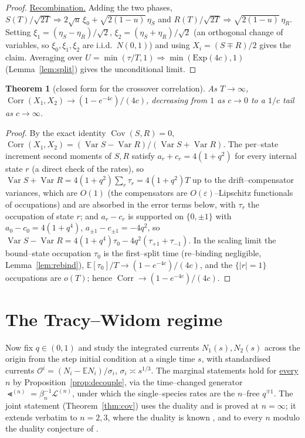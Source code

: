 \documentclass[11pt]{article}
\theoremstyle{plain}
\newtheorem{theorem}{Theorem}[section]
\theoremstyle{definition}
\theoremstyle{remark}
\DeclareMathOperator{\Var}{Var}\DeclareMathOperator{\Cov}{Cov}
\DeclareMathOperator{\Corr}{Corr}\DeclareMathOperator{\cum}{cum}
\newcommand{\E}{\mathbb{E}}\newcommand{\PP}{\mathbb{P}}\newcommand{\dd}{\,\mathrm{d}}
\newcommand{\To}{\Rightarrow}\newcommand{\so}{\mathfrak{so}}
\newcommand{\eps}{\varepsilon}\newcommand{\Exp}{\mathrm{Exp}}
\newcommand{\cL}{\mathcal L}\newcommand{\cO}{\mathcal O}\newcommand{\cE}{\mathcal E}
\begin{document}
\begin{proof}
\underline{Recombination.} Adding the two phases,
$S(T)/\sqrt{2T}\To2\sqrt u\,\xi_0+\sqrt{2(1-u)}\,\eta_S$ and
$R(T)/\sqrt{2T}\To\sqrt{2(1-u)}\,\eta_R$. Setting $\xi_1=(\eta_S-\eta_R)/\sqrt2$,
$\xi_2=(\eta_S+\eta_R)/\sqrt2$ (an orthogonal change of variables, so $\xi_0,\xi_1,\xi_2$
are i.i.d.\ $N(0,1)$) and using $X_i=(S\mp R)/2$ gives the claim. Averaging over
$U=\min(\tau/T,1)\To\min(\Exp(4c),1)$ (Lemma~\ref{lem:split}) gives the unconditional limit.
\end{proof}

\begin{theorem}[closed form for the crossover correlation]\label{thm:closed}
As $T\to\infty$, $\Corr(X_1,X_2)\to(1-e^{-4c})/(4c)$, decreasing from $1$ as $c\to0$ to a
$1/c$ tail as $c\to\infty$.
\end{theorem}
\begin{proof}
By the exact identity $\Cov(S,R)=0$,
$\Corr(X_1,X_2)=(\Var S-\Var R)/(\Var S+\Var R)$. The per--state increment second
moments of $S,R$ satisfy $a_r+c_r=4(1+q^2)$ for every internal state $r$ (a direct
check of the rates), so $\Var S+\Var R=4(1+q^2)\sum_r\tau_r=4(1+q^2)T$ up to the
drift--compensator variances, which are $O(1)$ (the compensators are
$O(\eps)$--Lipschitz functionals of occupations) and are absorbed in the error terms
below, with $\tau_r$ the occupation of state $r$; and $a_r-c_r$ is supported on $\{0,\pm1\}$ with
$a_0-c_0=4(1+q^4)$, $a_{\pm1}-c_{\pm1}=-4q^2$, so
$\Var S-\Var R=4(1+q^4)\tau_0-4q^2(\tau_{+1}+\tau_{-1})$. In the scaling limit the
bound--state occupation $\tau_0$ is the first--split time (re--binding negligible,
Lemma~\ref{lem:rebind}), $\E[\tau_0]/T\to(1-e^{-4c})/(4c)$, and the $\{|r|=1\}$
occupations are $o(T)$; hence $\Corr\to(1-e^{-4c})/(4c)$.
\end{proof}


\section{The Tracy--Widom regime}\label{sec:tw}

Now fix $q\in(0,1)$ and study the integrated currents $N_1(s),N_2(s)$ across the origin
from the step initial condition at a single time $s$, with standardised currents
$\cO^i=(N_i-\E N_i)/\sigma_i$, $\sigma_i\asymp s^{1/3}$. The marginal statements hold
for \underline{every} $n$ by Proposition~\ref{prop:decouple}, via the time--changed
generator $\Lt^{(n)}=\beta_n^{-1}\cL^{(n)}$, under which the single--species rates
are the $n$--free $q^{\mp1}$. The joint statement (Theorem~\ref{thm:cov}) uses the
duality and is proved at $n=\infty$; it extends verbatim to $n=2,3$, where the
duality is known \cite{REU}, and to every $n$ modulo the duality conjecture of
\cite[Rmk.~4]{REU}.
\end{document}
